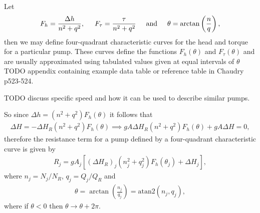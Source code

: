 Let 
\begin{align*}
F_h = \frac{\Delta h}{n^2 + q^2}, \hspace{0.5cm} F_{\tau} = \frac{\tau}{n^2 + q^2} \hspace{0.5cm} \text{and} \hspace{0.5cm} \theta = \arctan\left( \frac{n}{q} \right), 
\end{align*}
then we may define four-quadrant characteristic curves for the head and torque for a particular pump. These curves define the functions $F_h(\theta)$ and $F_{\tau}(\theta)$ and are usually approximated using tabulated values given at equal intervals of $\theta$ {\color{red} TODO appendix containing example data table or reference table in Chaudry p523-524}. 

{\color{red} TODO discuss specific speed and how it can be used to describe similar pumps.}


So since $\Delta h = \left(n^2 + q^2 \right) F_h(\theta)$ it follows that 
\begin{align}
\Delta H = - \Delta H_R \left(n^2 + q^2 \right) F_h(\theta) \implies g A \Delta H_R \left(n^2 + q^2 \right) F_h(\theta) + g A \Delta H = 0,
\end{align}
therefore the resistance term for a pump defined by a four-quadrant characteristic curve is given by 
\begin{align}\label{pump_resistance}
\boxed{ R_j = g A_j \left[ \left( \Delta H_R \right)_j \left(n_j^2 + q_j^2 \right) F_h(\theta_j) + \Delta H_j \right], }
\end{align}
where $n_j = N_j / N_R$, $q_j = Q_j / Q_R$ and 
\begin{align*}
\theta = \arctan\left(\frac{n_j}{q_j} \right) = \text{atan2}(n_j, q_j),
\end{align*}
where if $\theta < 0$ then $\theta \rightarrow \theta + 2 \pi$. 